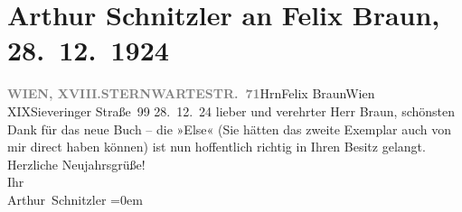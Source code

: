 

         
         \newcommand{\erwaehntePersonen}{Personen: Felix Braun}
         \newcommand{\erwaehnteOrte}{Orte: Sieveringer Straße, Sternwartestraße, Wien, XIX., Döbling, XVIII., Währing}
         \newcommand{\erwaehnteWerke}{Werke: Fräulein Else}
               \section[Arthur Schnitzler an Felix Braun, 28. 12. 1924]{ Arthur Schnitzler an Felix Braun, 28. 12. 1924}\nopagebreak{}\rehead{ }\begin{ledgroupsized}[t]{13cm}\normalsize\beginnumbering \toendnotes[C]{\smallbreak\pagebreak[2]} 
\toendnotes[C]{\smallbreak}\pstart{}{\pb}\label{T_L02426-1v}\label{T_L02426-1h}\pend{}\pstart{}\textcolor{gray}{\textbf{WIEN, XVIII.}}\pend{}\pstart{}\textcolor{gray}{\textbf{STERNWARTESTR. 71}}\pend{}{\bigskip}\pstart{}Hrn\pend{}\pstart{}Felix Braun\pend{}\pstart{}Wien XIX\pend{}\pstart{}Sieveringer Straße 99\pend{}{\bigskip}\pstart
           \raggedleft{}{\pb}28. 12. 24\pend
           \pstart{}lieber und verehrter Herr Braun, \pend\pstart
           schönsten Dank für das neue Buch – die »Else«
                    (Sie hätten das zweite Exemplar auch von mir direct haben können) ist nun
                    hoffentlich richtig in Ihren{\pb} Besitz
                    gelangt.\pend
           \pstart
           Herzliche Neujahrsgrüße!{\\[\baselineskip]}Ihr{\\[\baselineskip]}\spacefill\mbox{Arthur Schnitzler}\pend
           \leftskip=0em{}
         
         \endnumbering{}\end{ledgroupsized}  \newcommand{\dateiname}{L02426}\newcommand{\titel}{Arthur Schnitzler an Felix Braun, 28. 12. 1924}\newcommand{\editorInnen}{Martin Anton Müller und Gerd-Hermann Susen}
      